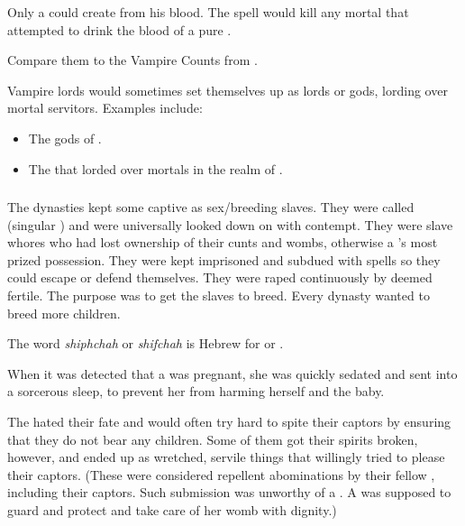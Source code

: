 Only a \bezed could create \reavers from his blood. 
The spell would kill any mortal that attempted to drink the blood of a pure \resphan.

Compare them to the Vampire Counts from \cite{RPG:Warhammer}. 

Vampire lords would sometimes set themselves up as lords or gods, lording over mortal servitors. 
Examples include:

\begin{itemize}
  \item 
    The gods of . 
  \item 
    The  that lorded over mortals in the realm of . 
\end{itemize}







\subsubsection[Yurideth]{\Yurideth}
\index{\yurid}
The \resphan{} dynasties kept some captive \resviel{} as sex/breeding slaves. 
They were called \yurideth{} (singular \yurid{}) and were universally looked down on with contempt. 
They were slave whores who had lost ownership of their cunts and wombs, otherwise a \resvil{}'s most prized possession.
They were kept imprisoned and subdued with spells so they could escape or defend themselves. 
They were raped continuously by \resphain{} deemed fertile. The purpose was to get the slaves to breed. 
Every dynasty wanted to breed more children. 

The word \emph{shiphchah} or \emph{shifchah} is Hebrew for  or . 

When it was detected that a \yurid{} was pregnant, she was quickly sedated and sent into a sorcerous sleep, to prevent her from harming herself and the baby. 

The \yurideth{} hated their fate and would often try hard to spite their captors by ensuring that they do not bear any children. Some of them got their spirits broken, however, and ended up as wretched, servile things that willingly tried to please their captors. 
(These were considered repellent abominations by their fellow \resphain{}, including their captors. Such submission was unworthy of a \resvil{}. A \resvil{} was supposed to guard and protect and take care of her womb with dignity.)

